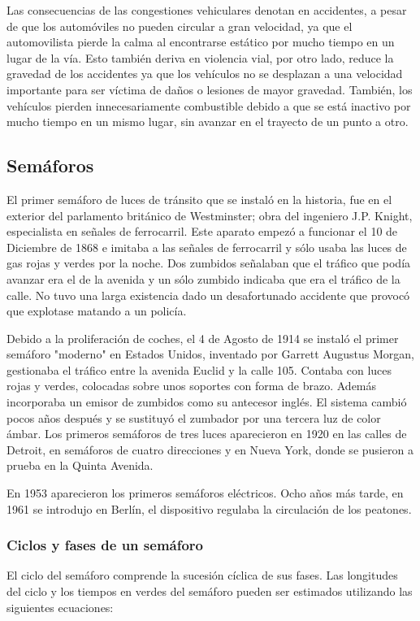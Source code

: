 Las consecuencias de las congestiones vehiculares denotan en accidentes, a pesar de que los automóviles no pueden circular a gran velocidad, ya que el automovilista pierde la calma al encontrarse estático por mucho tiempo en un lugar de la vía. Esto también deriva en violencia vial, por otro lado, reduce la gravedad de los accidentes ya que los vehículos no se desplazan a una velocidad importante para ser víctima de daños o lesiones de mayor gravedad. También, los vehículos pierden innecesariamente combustible debido a que se está inactivo por mucho tiempo en un mismo lugar, sin avanzar en el trayecto de un punto a otro.

\subsection{Semáforos}

El primer semáforo de luces de tránsito que se instaló en la historia, fue en el exterior del parlamento británico de Westminster; obra del ingeniero J.P. Knight, especialista en señales de ferrocarril. Este aparato empezó a funcionar el 10 de Diciembre de 1868 e imitaba a las señales de ferrocarril y sólo usaba las luces de gas rojas y verdes por la noche. Dos zumbidos señalaban que el tráfico que podía avanzar era el de la avenida y un sólo zumbido indicaba que era el tráfico de la calle. No tuvo una larga existencia dado un desafortunado accidente que provocó que explotase matando a un policía.

Debido a la proliferación de coches, el 4 de Agosto de 1914 se instaló el primer semáforo "moderno" en Estados Unidos, inventado por Garrett Augustus Morgan, gestionaba el tráfico entre la avenida Euclid y la calle 105. Contaba con luces rojas y verdes, colocadas sobre unos soportes con forma de brazo. Además incorporaba un emisor de zumbidos como su antecesor inglés. El sistema cambió pocos años después y se sustituyó el zumbador por una tercera luz de color ámbar. Los primeros semáforos de tres luces aparecieron en 1920 en las calles de Detroit, en semáforos de cuatro direcciones y en Nueva York, donde se pusieron a prueba en la Quinta Avenida.

En 1953 aparecieron los primeros semáforos eléctricos. Ocho años más tarde, en 1961 se introdujo en Berlín, el dispositivo regulaba la circulación de los peatones.

\subsubsection{Ciclos y fases de un semáforo}
El ciclo del semáforo comprende la sucesión cíclica de sus fases. Las longitudes del ciclo y los tiempos en verdes del semáforo pueden ser estimados utilizando las siguientes ecuaciones:


